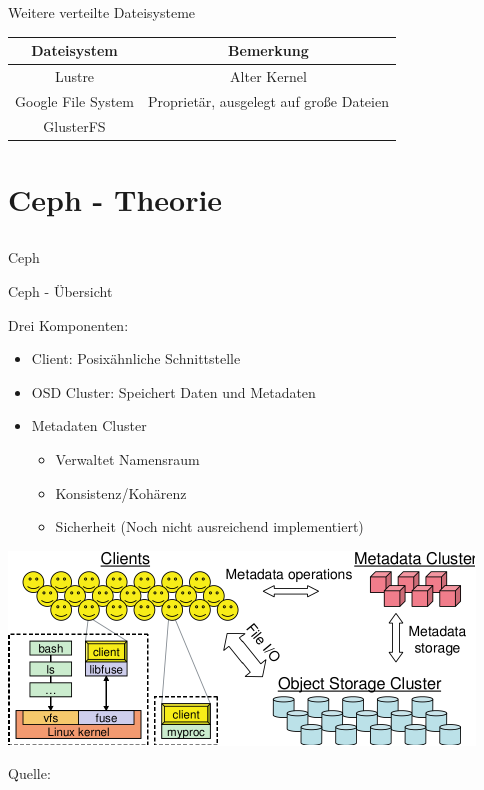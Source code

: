\documentclass[notes=hide,yellow]{beamer}
\begin{document}
\begin{frame}{Weitere verteilte Dateisysteme}
	\begin{center}
		\begin{tabular}{|c|c|}
		\hline
		Dateisystem & Bemerkung \\
		\hline
		Lustre & Alter Kernel \\
		Google File System & Propriet\"ar, ausgelegt auf große Dateien \\
		GlusterFS & \\
		\hline
	\end{tabular}
	\end{center}
\end{frame}


\section{Ceph - Theorie}
\subsection*{}

\begin{frame}
	\begin{center}
	\Large{Ceph}
	\end{center}
\end{frame}

\begin{frame}{Ceph - \"Ubersicht}
	
	Drei Komponenten:
	\begin{itemize}
		\item Client: Posix\"ahnliche Schnittstelle %
		\item OSD Cluster: Speichert Daten und Metadaten
		\item Metadaten Cluster
			\begin{itemize}
				\item Verwaltet Namensraum
				\item Konsistenz/Koh\"arenz
				\item Sicherheit (Noch nicht ausreichend implementiert)
			\end{itemize}
	\end{itemize}
\end{frame}

\begin{frame}
	\begin{center}
		\includegraphics{ceph_architecture.pdf}
	\end{center}
	Quelle: \cite{weil2006}
\end{frame}
\end{document}
